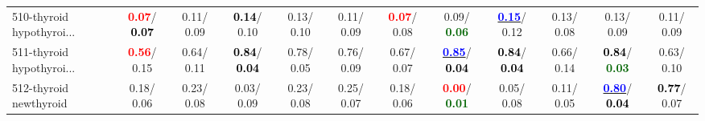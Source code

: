 \begin{table}[h]
\begin{center}
{\begin{tabular}{lc|c|c|c|c|c|c|c|c|c|c}
510-thyroid hypothyroi... & \textcolor{red}{\textbf{  0.07}}/\textcolor{black}{\textbf{  0.07}} &   0.11/  0.09 & \textcolor{black}{\textbf{  0.14}}/  0.10 &   0.13/  0.10 &   0.11/  0.09 & \textcolor{red}{\textbf{  0.07}}/  0.08 &   0.09/\textcolor{darkgreen}{\textbf{  0.06}} & \underline{\textcolor{blue}{\textbf{  0.15}}}/  0.12 &   0.13/  0.08 &   0.13/  0.09 &   0.11/  0.09 \\
511-thyroid hypothyroi... & \textcolor{red}{\textbf{  0.56}}/  0.15 &   0.64/  0.11 & \textcolor{black}{\textbf{  0.84}}/\textcolor{black}{\textbf{  0.04}} &   0.78/  0.05 &   0.76/  0.09 &   0.67/  0.07 & \underline{\textcolor{blue}{\textbf{  0.85}}}/\textcolor{black}{\textbf{  0.04}} & \textcolor{black}{\textbf{  0.84}}/\textcolor{black}{\textbf{  0.04}} &   0.66/  0.14 & \textcolor{black}{\textbf{  0.84}}/\textcolor{darkgreen}{\textbf{  0.03}} &   0.63/  0.10 \\
512-thyroid newthyroid &   0.18/  0.06 &   0.23/  0.08 &   0.03/  0.09 &   0.23/  0.08 &   0.25/  0.07 &   0.18/  0.06 & \textcolor{red}{\textbf{  0.00}}/\textcolor{darkgreen}{\textbf{  0.01}} &   0.05/  0.08 &   0.11/  0.05 & \underline{\textcolor{blue}{\textbf{  0.80}}}/\textcolor{black}{\textbf{  0.04}} & \textcolor{black}{\textbf{  0.77}}/  0.07 \\\end{tabular}}\label{stratsALCKappa15AllReduxHalfa}
\end{center}
\end{table}
